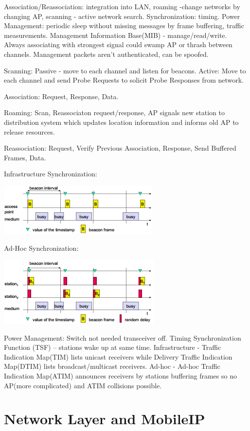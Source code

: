 \documentclass[8pt]{extarticle}
\begin{document}
\begin{multicols}{2}
Association/Reassociation: integration into LAN, roaming -change networks by changing AP, scanning - active network search. Synchronization: timing. Power Management: periodic sleep without missing messages by frame buffering, traffic measurements. Management Information Base(MIB) - manage/read/write. Always associating with strongest signal could swamp AP or thrash between channels. Management packets aren't authenticated, can be spoofed.

Scanning: Passive - move to each channel and listen for beacons. Active:  Move to each channel and send Probe Requests to solicit Probe Responses from network.

Association: Request, Response, Data.

Roaming: Scan, Reassociaton request/response, AP signals new station to distribution system which updates location information and informs old AP to release resources.

Reassociation: Request, Verify Previous Association, Response, Send Buffered Frames, Data.

Infrastructure Synchronization:

\includegraphics{infrastructuresynchronization.png}

Ad-Hoc Synchronization: 

\includegraphics{adhocsynchronization.png}

Power Management: Switch not needed transceiver off. Timing Synchronization Function (TSF) – stations wake up at same time. Infrastructure - Traffic Indication Map(TIM) lists unicast receivers while Delivery Traffic Indication Map(DTIM) lists broadcast/multicast receivers. Ad-hoc - Ad-hoc Traffic Indication Map(ATIM) announces receivers by stations buffering frames so no AP(more complicated) and ATIM collisions possible.

\section{Network Layer and MobileIP}


\end{multicols}
\end{document}
